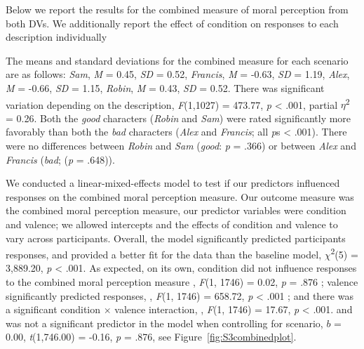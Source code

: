 \documentclass[
  american,
  man,floatsintext]{apa7}
\begin{document}
Below we report the results for the combined measure of moral perception from both DVs. We additionally report the effect of condition on responses to each description individually

The means and standard deviations for the combined measure for each scenario are as follows:
\emph{Sam},
\emph{M} = 0.45, \emph{SD} = 0.52,
\emph{Francis},
\emph{M} = -0.63, \emph{SD} = 1.19,
\emph{Alex},
\emph{M} = -0.66, \emph{SD} = 1.15,
\emph{Robin},
\emph{M} = 0.43, \emph{SD} = 0.52. There was significant variation depending on the description, \emph{F}(1,1027) = 473.77, \emph{p} \textless{} .001, partial \(\eta\)\textsuperscript{2} = 0.26. Both the \emph{good} characters (\emph{Robin} and \emph{Sam}) were rated significantly more favorably than both the \emph{bad} characters (\emph{Alex} and \emph{Francis}; all \emph{p}s \textless{} .001). There were no differences between \emph{Robin} and \emph{Sam} (\emph{good}: \emph{p} = .366) or between \emph{Alex} and \emph{Francis} (\emph{bad}; (\emph{p} = .648)).

We conducted a linear-mixed-effects model to test if our predictors influenced responses on the combined moral perception measure. Our outcome measure was the combined moral perception measure, our predictor variables were condition and valence; we allowed intercepts and the effects of condition and valence to vary across participants.
Overall, the model significantly predicted participants responses, and provided a better fit for the data than the baseline model,
\(\chi\)\textsuperscript{2}(5) = 3,889.20, \emph{p} \textless{} .001.
As expected, on its own, condition did not influence responses to the combined moral perception measure
, \emph{F}(1, 1746) = 0.02, \emph{p} = .876
; valence significantly predicted responses,
, \emph{F}(1, 1746) = 658.72, \emph{p} \textless{} .001
; and there was a significant condition \(\times\) valence interaction,
, \emph{F}(1, 1746) = 17.67, \emph{p} \textless{} .001.
and was not a significant predictor in the model when controlling for scenario, \(b\) = 0.00, \emph{t}(1,746.00) = -0.16, \emph{p} = .876, see Figure~\ref{fig:S3combinedplot}.
\end{document}
